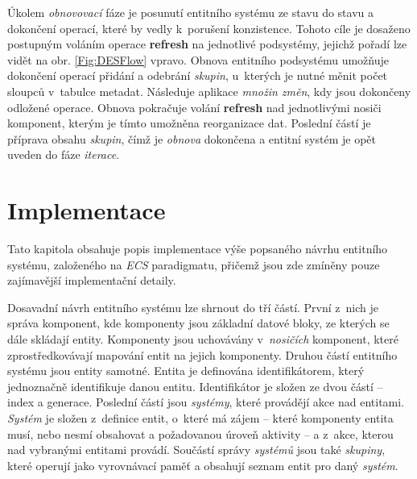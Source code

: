 Úkolem \emph{obnovovací} fáze je posunutí entitního systému ze stavu  do stavu  a dokončení operací, které by vedly k~porušení konzistence. Tohoto cíle je dosaženo postupným voláním operace \textbf{refresh} na jednotlivé podsystémy, jejichž pořadí lze vidět na obr. \ref{Fig:DESFlow} vpravo. Obnova entitního podsystému umožňuje dokončení operací přidání a odebrání \emph{skupin}, u~kterých je nutné měnit počet sloupců v~tabulce metadat. Následuje aplikace \emph{množin změn}, kdy jsou dokončeny odložené operace. Obnova pokračuje volání \textbf{refresh} nad jednotlivými nosiči komponent, kterým je tímto umožněna reorganizace dat. Poslední částí je příprava obsahu \emph{skupin}, čímž je \emph{obnova} dokončena a entitní systém je opět uveden do fáze \emph{iterace}.

\chapter{Implementace}
\label{Chap:Implementation}

Tato kapitola obsahuje popis implementace výše popsaného návrhu entitního systému, založeného na \emph{ECS} paradigmatu, přičemž jsou zde zmíněny pouze zajímavější implementační detaily. 



Dosavadní návrh entitního systému lze shrnout do tří částí. První z~nich je správa komponent, kde komponenty jsou základní datové bloky, ze kterých se dále skládají entity. Komponenty jsou uchovávány v~\emph{nosičích} komponent, které zprostředkovávají mapování entit na jejich komponenty. Druhou částí entitního systému jsou entity samotné. Entita je definována identifikátorem, který jednoznačně identifikuje danou entitu. Identifikátor je složen ze dvou částí -- index a generace. Poslední částí jsou \emph{systémy}, které provádějí akce nad entitami. \emph{Systém} je složen z~definice entit, o~které má zájem -- které komponenty entita musí, nebo nesmí obsahovat a požadovanou úroveň aktivity -- a z~akce, kterou nad vybranými entitami provádí. Součástí správy \emph{systémů} jsou také \emph{skupiny}, které operují jako vyrovnávací paměť a obsahují seznam entit pro daný \emph{systém}. 


